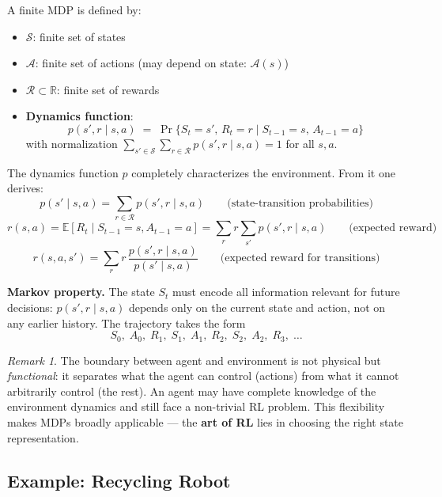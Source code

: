 \documentclass[11pt,a4paper]{article}
\theoremstyle{definition}
\theoremstyle{plain}
\theoremstyle{remark}
\newtheorem*{remark}{Remark}
\begin{document}
\begin{tcolorbox}[colback=blue!5!white, colframe=blue!60!black, title={MDP Tuple}]
A finite MDP is defined by:
\begin{itemize}
    \item $\mathcal{S}$: finite set of states
    \item $\mathcal{A}$: finite set of actions (may depend on state: $\mathcal{A}(s)$)
    \item $\mathcal{R} \subset \mathbb{R}$: finite set of rewards
    \item \textbf{Dynamics function}:
    \[
        p(s', r \mid s, a) \;=\; \Pr\{S_t = s',\, R_t = r \mid S_{t-1} = s,\, A_{t-1} = a\}
    \]
    with normalization $\sum_{s' \in \mathcal{S}} \sum_{r \in \mathcal{R}} p(s', r \mid s, a) = 1$ for all $s, a$.
\end{itemize}
\end{tcolorbox}

The dynamics function $p$ completely characterizes the environment. From it one derives:
\[
    p(s' \mid s, a) = \sum_{r \in \mathcal{R}} p(s', r \mid s, a) \qquad \text{(state-transition probabilities)}
\]
\[
    r(s, a) = \mathbb{E}[R_t \mid S_{t-1}=s, A_{t-1}=a] = \sum_{r} r \sum_{s'} p(s', r \mid s, a) \qquad \text{(expected reward)}
\]
\[
    r(s, a, s') = \sum_{r} r \,\frac{p(s', r \mid s, a)}{p(s' \mid s, a)} \qquad \text{(expected reward for transitions)}
\]

\textbf{Markov property.} The state $S_t$ must encode all information relevant for future decisions: $p(s', r \mid s, a)$ depends only on the current state and action, not on any earlier history. The trajectory takes the form
\[
    S_0,\; A_0,\; R_1,\; S_1,\; A_1,\; R_2,\; S_2,\; A_2,\; R_3,\; \ldots
\]

\begin{remark}
The boundary between agent and environment is not physical but \emph{functional}: it separates what the agent can control (actions) from what it cannot arbitrarily control (the rest). An agent may have complete knowledge of the environment dynamics and still face a non-trivial RL problem. This flexibility makes MDPs broadly applicable — the \textbf{art of RL} lies in choosing the right state representation.
\end{remark}

\subsection{Example: Recycling Robot}
\end{document}
